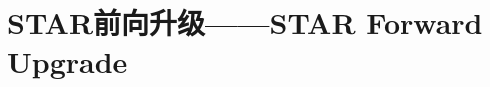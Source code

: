 \setcounter{section}{0}

\setcounter{figure}{0}
\setcounter{table}{0}
\setcounter{equation}{0}

\chapter{STAR前向升级——STAR Forward Upgrade}





